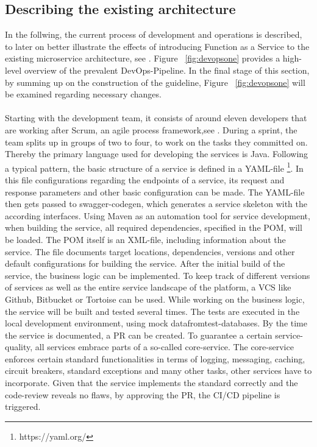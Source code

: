 \documentclass[a4paper,twoside,11pt, pagesize]{scrartcl}
\begin{document}
\begin{spacing}{1.2}
\subsection{Describing the existing architecture}
In the follwing, the current process of development and operations is described, to later on better illustrate the effects of introducing Function as a Service to the existing microservice architecture, see \cite{newman2015building}. Figure ~\ref{fig:devopsone} provides a high-level overview of the prevalent DevOps-Pipeline. In the final stage of this section, by summing up on the construction of the guideline, Figure ~\ref{fig:devopsone} will be examined regarding necessary changes.\\\\ Starting with the development team, it consists of around eleven developers that are working after Scrum, an agile process framework,see \cite{pichler2013scrum}. During a sprint, the team splits up in groups of two to four, to work on the tasks they committed on. Thereby the primary language used for developing the services is Java. Following a typical pattern, the basic structure of a service is defined in a YAML-file \footnote{https://yaml.org/}. In this file configurations regarding the endpoints of a service, its request and response parameters and other basic configuration can be made. The YAML-file then gets passed to swagger-codegen, which generates a service skeleton with the according interfaces. Using Maven as an automation tool for service development, when building the service, all required dependencies, specified in the POM, will be loaded. The POM itself is an XML-file, including information about the service. The file documents target locations, dependencies, versions and other default configurations for building the service. After the initial build of the service, the business logic can be implemented. To keep track of different versions of services as well as the entire service landscape of the platform, a VCS like Github, Bitbucket or Tortoise can be used. While working on the business logic, the service will be built and tested several times. The tests are executed in the local development environment, using mock datafromtest-databases. By the time the service is documented, a PR can be created. To guarantee a certain service-quality, all services embrace parts of a so-called core-service. The core-service enforces certain standard functionalities in terms of logging, messaging, caching, circuit breakers, standard exceptions and many other tasks, other services have to incorporate. Given that the service implements the standard correctly and the code-review reveals no flaws, by approving the PR, the CI/CD pipeline is triggered.    

\end{spacing}
\end{document}
